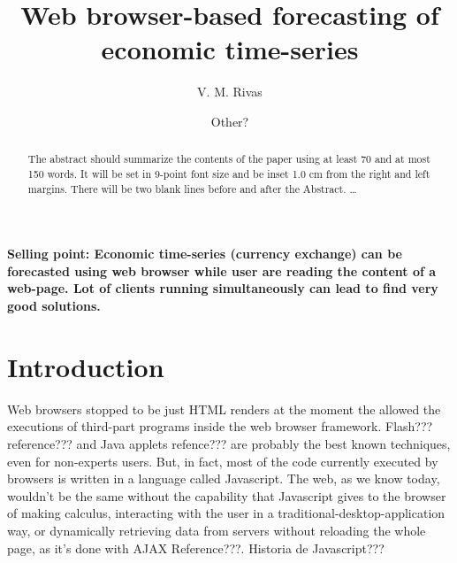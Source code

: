 \documentclass{llncs}
\begin{document}
%
%
\mainmatter              %
%
\title{Web browser-based forecasting of economic time-series}
%
%
\author{
V. M. Rivas 
\and Other?
}
%
%
%

\maketitle              %
\textbf{Selling point: Economic time-series (currency exchange) can be forecasted using web browser while user are reading the content of a web-page. Lot of clients running simultaneously can lead to find very good solutions.}
\begin{abstract}
{\color{red}
The abstract should summarize the contents of the paper
using at least 70 and at most 150 words. It will be set in 9-point
font size and be inset 1.0 cm from the right and left margins.
There will be two blank lines before and after the Abstract. \dots
}
\end{abstract}
%
\section{Introduction}
Web browsers stopped to be just HTML renders at the moment the allowed the executions of third-part programs inside the web browser framework. Flash??? reference??? and Java applets refence??? are probably the best known techniques, even for non-experts users. But, in fact, most of the code currently executed by browsers is written in a language called Javascript. The web, as we know today, wouldn't be the same without the capability that Javascript gives to the browser of making calculus, interacting with the user in a traditional-desktop-application way, or dynamically retrieving data from servers without reloading the whole page, as it's done with AJAX Reference???. Historia de Javascript??? 
\end{document}
